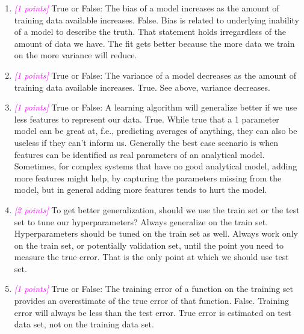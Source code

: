\documentclass{article}
\newcommand{\1}{\mathbf{1}}
\newcommand{\points}[1]{\small\textcolor{magenta}{\emph{[#1 points]}} \normalsize}
\begin{document}
\begin{enumerate}
    \item\points{1} True or False:  The bias of a model increases as the amount of training data available increases.\newline
    False. Bias is related to underlying inability of a model to describe the truth. That statement holds irregardless of the amount of data we have. The fit gets better because the more data we train on the more variance will reduce.

    \item\points{1} True  or  False:  The  variance  of  a  model  decreases  as  the  amount  of  training  data  available increases.\newline
    True. See above, variance decreases.

    \item\points{1} True or False:  A learning algorithm will generalize better if we use less features to represent our data.\newline
    True. While true that a 1 parameter model can be great at, f.e., predicting averages of anything, they can also be useless if they can't inform us. Generally the best case scenario is when features can be identified as real parameters of an analytical model. Sometimes, for complex systems that have no good analytical model, adding more features might help, by capturing the parameters missing from the model, but in general adding more features tends to hurt the model.

    \item\points{2} To get better generalization, should we use the train set or the test set to tune our hyperparameters?\newline
    Always generalize on the train set. Hyperparameters should be tuned on the train set as well. Always work only on the train set, or potentially validation set, until the point you need to measure the true error. That is the only point at which we should use test set. 

    \item\points{1} True or False:  The training error of a function on the training set provides an overestimate of the true error of that function. \newline
    False. Training error will always be less than the test error. True error is estimated on test data set, not on the training data set.
\end{enumerate}
\end{document}
